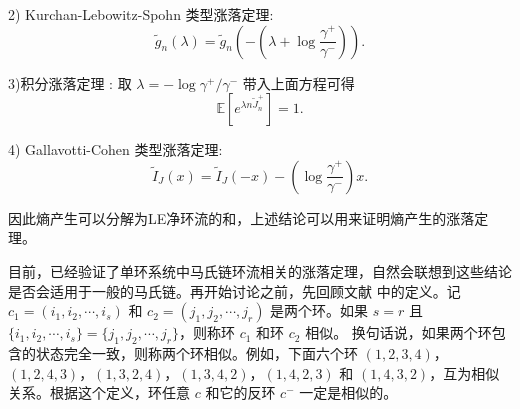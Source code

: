 2) Kurchan-Lebowitz-Spohn 类型涨落定理:
\begin{equation*}
\tilde{g}_n(\lambda)=\tilde{g}_n\left(-\left(\lambda+\log\frac{\gamma^+}{\gamma^-}\right)\right).
\end{equation*}

3)积分涨落定理 : 取 $\lambda = -\log \gamma^+/\gamma^-$ 带入上面方程可得
\begin{equation*}
\mathbb{E}\left[e^{\lambda n\tilde{J}^+_n}\right]=1.
\end{equation*}

4) Gallavotti-Cohen 类型涨落定理:
\begin{equation*}
\tilde{I}_J(x)=\tilde{I}_J(-x)-\left(\log\frac{\gamma^+}{\gamma^-}\right)x.
\end{equation*}

因此熵产生可以分解为LE净环流\cite{Seifert_2012}的和，上述结论可以用来证明熵产生的涨落定理。

目前，已经验证了单环系统中马氏链环流相关的涨落定理，自然会联想到这些结论是否会适用于一般的马氏链。再开始讨论之前，先回顾文献 \cite{jia2016cycle}中的定义。记 $c_1=(i_1,i_2,\cdots,i_s)$ 和 $c_2=(j_1,j_2,\cdots,j_r)$ 是两个环。如果 $s=r$ 且 $\{i_1,i_2,\cdots,i_s\}=\{j_1,j_2,\cdots,j_r\}$，则称环 $c_1$ 和环 $c_2$ 相似。
换句话说，如果两个环包含的状态完全一致，则称两个环相似。例如，下面六个环 $(1,2,3,4)$，$(1,2,4,3)$，$(1,3,2,4)$，$(1,3,4,2)$，$(1,4,2,3)$ 和 $(1,4,3,2)$，互为相似关系。根据这个定义，环任意 $c$ 和它的反环 $c^-$ 一定是相似的。

